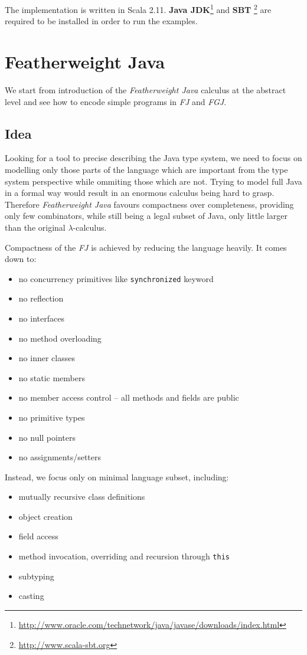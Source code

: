 \documentclass{article}[12pt]
\begin{document}
The implementation is written in Scala 2.11.
\textbf{Java JDK}\footnote{
\url{http://www.oracle.com/technetwork/java/javase/downloads/index.html}
} and \textbf{SBT} \footnote{
\url{http://www.scala-sbt.org}
} are required to be installed in order to run the examples.

\section{Featherweight Java}

We start from introduction of the \emph{Featherweight Java} calculus at
the abstract level and see how to encode simple programs in \emph{FJ}
and \emph{FGJ}.

\subsection{Idea}

Looking for a tool to precise describing the Java type system, we need
to focus on modelling only those parts of the language which are
important from the type system perspective while ommiting those
which are not. Trying to model full Java in a formal way would result
in an enormous calculus being hard to grasp. Therefore
\emph{Featherweight Java} favours compactness over completeness,
providing only few combinators, while still being a legal subset
of Java, only little larger than the original $\lambda$-calculus.

Compactness of the \emph{FJ} is achieved by reducing the language
heavily. It comes down to:

\begin{itemize}
\item no concurrency primitives like \texttt{synchronized} keyword
\item no reflection
\item no interfaces
\item no method overloading
\item no inner classes
\item no static members
\item no member access control -- all methods and fields are public
\item no primitive types
\item no null pointers
\item no assignments/setters
\end{itemize}
Instead, we focus only on minimal language subset, including:

\begin{itemize}
\item mutually recursive class definitions
\item object creation
\item field access
\item method invocation, overriding and recursion through \texttt{this}
\item subtyping
\item casting
\end{itemize}
\end{document}
